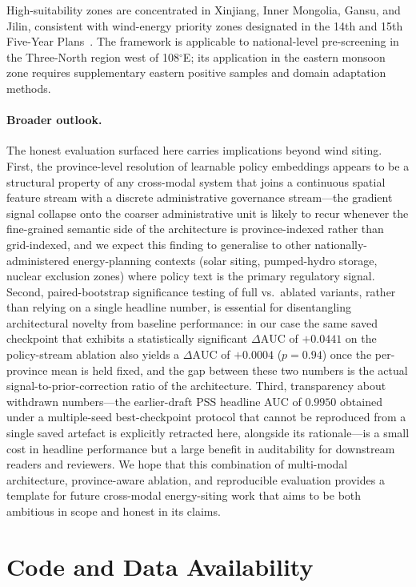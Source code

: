 \documentclass[12pt, a4paper]{article}
\begin{document}
High-suitability zones are concentrated in Xinjiang, Inner
Mongolia, Gansu, and Jilin, consistent with wind-energy
priority zones designated in the 14th and 15th Five-Year
Plans~\cite{ndrc2022,ndrc2026,he2020,zhong2022}. The
framework is applicable to national-level pre-screening in
the Three-North region west of 108$^\circ$E; its
application in the eastern monsoon zone requires
supplementary eastern positive samples and domain
adaptation methods.

\paragraph{Broader outlook.}
The honest evaluation surfaced here carries implications
beyond wind siting. First, the province-level resolution of
learnable policy embeddings appears to be a structural
property of any cross-modal system that joins a continuous
spatial feature stream with a discrete administrative
governance stream---the gradient signal collapse onto the
coarser administrative unit is likely to recur whenever the
fine-grained semantic side of the architecture is
province-indexed rather than grid-indexed, and we expect
this finding to generalise to other nationally-administered
energy-planning contexts (solar siting, pumped-hydro
storage, nuclear exclusion zones) where policy text is the
primary regulatory signal. Second, paired-bootstrap
significance testing of full vs.\ ablated variants, rather
than relying on a single headline number, is essential for
disentangling architectural novelty from baseline
performance: in our case the same saved checkpoint that
exhibits a statistically significant $\Delta\text{AUC}$ of
$+0.0441$ on the policy-stream ablation also yields a
$\Delta\text{AUC}$ of $+0.0004$ ($p=0.94$) once the
per-province mean is held fixed, and the gap between these
two numbers is the actual signal-to-prior-correction ratio
of the architecture. Third, transparency about withdrawn
numbers---the earlier-draft PSS headline AUC of $0.9950$
obtained under a multiple-seed best-checkpoint protocol that
cannot be reproduced from a single saved artefact is
explicitly retracted here, alongside its rationale---is a
small cost in headline performance but a large benefit in
auditability for downstream readers and reviewers. We hope
that this combination of multi-modal architecture,
province-aware ablation, and reproducible evaluation
provides a template for future cross-modal energy-siting
work that aims to be both ambitious in scope and honest in
its claims.

\section*{Code and Data Availability}
\end{document}
